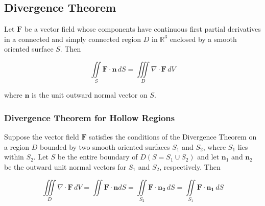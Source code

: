 \subsection{Divergence Theorem}
Let $\mathbf{F}$ be a vector field whose components have continuous first partial derivatives in a connected and simply connected region $D$ in $\mathbb{R}^3$ enclosed by a smooth oriented surface $S$. Then

\begin{equation}
    \iint \limits _S \mathbf{F \cdot n}\, dS = \iiint \limits _D \nabla \cdot \mathbf{F}\, dV
\end{equation}

\noindent where $\mathbf{n}$ is the unit outward normal vector on $S$.

\subsubsection{Divergence Theorem for Hollow Regions}
Suppose the vector field $\mathbf{F}$ satisfies the conditions of the Divergence Theorem on a region $D$ bounded by two smooth oriented surfaces $S_1$ and $S_2$, where $S_1$ lies within $S_2$. Let $S$ be the entire boundary of $D( S = S_1 \cup S_2 )$ and let $\mathbf{n}_1$ and $\mathbf{n}_2$ be the outward unit normal vectors for $S_1$ and $S_2$, respectively. Then

\begin{equation}
    \iiint \limits _D \nabla \cdot \mathbf{F} \, dV = \iint \limits \mathbf{F \cdot n} dS = \iint \limits _{S_2} \mathbf{F \cdot n_2}\, dS = \iint \limits _{S_1} \mathbf{F \cdot n_1}\, dS
\end{equation}
